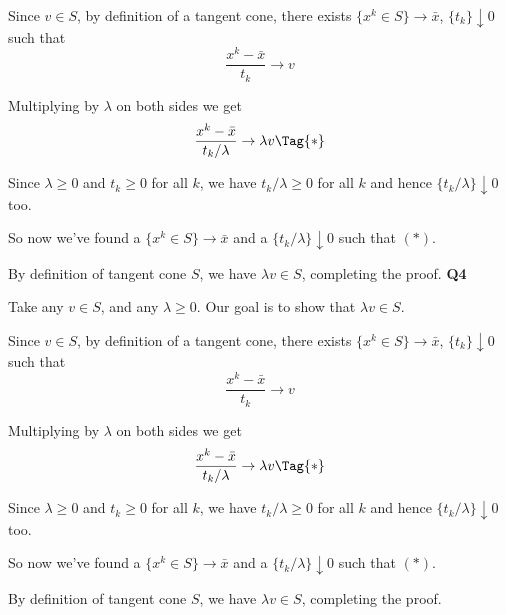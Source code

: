 Since $v\in S$, by definition of a tangent cone, there exists
$\{x^k\in S\}\to\bar x$, $\{t_k\}\downarrow0$ such that
\begin{equation*}
	\frac{x^k-\bar x}{t_k}\to v
\end{equation*}

Multiplying by $\lambda$ on both sides we get
\begin{equation*}
  \frac{x^k-\bar x}{t_k/\lambda}\to\lambda v\Tag{*}
\end{equation*}

Since $\lambda\geq0$ and $t_k\geq0$ for all $k$, we have
$t_k/\lambda\geq0$ for all $k$ and hence $\{t_k/\lambda\}\downarrow0$
too.

So now we've found a $\{x^k\in S\}\to\bar x$ and a
$\{t_k/\lambda\}\downarrow0$ such that $(*)$.
	
By definition of tangent cone $S$, we have $\lambda v\in
S$, completing the proof.
{\large\textbf{Q4}}

Take any $v\in S$, and any $\lambda\geq0$. Our goal is to show that
$\lambda v\in S$.

Since $v\in S$, by definition of a tangent cone, there exists
$\{x^k\in S\}\to\bar x$, $\{t_k\}\downarrow0$ such that
\begin{equation*}
	\frac{x^k-\bar x}{t_k}\to v
\end{equation*}

Multiplying by $\lambda$ on both sides we get
\begin{equation*}
  \frac{x^k-\bar x}{t_k/\lambda}\to\lambda v\Tag{*}
\end{equation*}

Since $\lambda\geq0$ and $t_k\geq0$ for all $k$, we have
$t_k/\lambda\geq0$ for all $k$ and hence $\{t_k/\lambda\}\downarrow0$
too.

So now we've found a $\{x^k\in S\}\to\bar x$ and a
$\{t_k/\lambda\}\downarrow0$ such that $(*)$.
	
By definition of tangent cone $S$, we have $\lambda v\in
S$, completing the proof.
